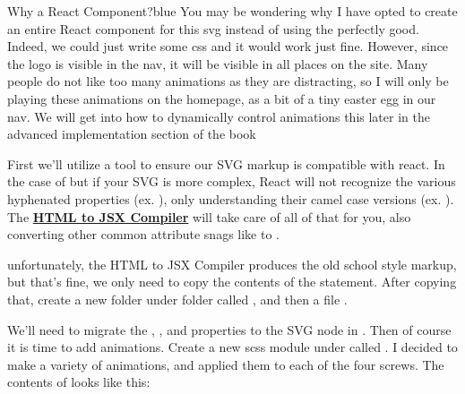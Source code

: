 \documentclass[paper=6in:9in,pagesize=pdftex,headinclude=on,footinclude=on,12pt]{scrbook}
\newcommand{\link}[2]{\textbf{\textcolor{monokaiPink}{\href{#2}{#1}}}}
\begin{document}
\begin{highlightBox}{Why a React Component?}{blue}{\information}
You may be wondering why I have opted to create an entire React component for this svg instead of using the perfectly good. Indeed, we could just write some css and it would work just fine. However, since the logo is visible in the nav, it will be visible in all places on the site. Many people do not like too many animations as they are distracting, so I will only be playing these animations on the homepage, as a bit of a tiny easter egg in our nav. We will get into how to dynamically control animations this later in the advanced implementation section of the book
\end{highlightBox}

First we'll utilize a tool to ensure our SVG markup is compatible with react. In the case of  but if your SVG is more complex, React will not recognize the various hyphenated properties (ex. ), only understanding their camel case versions (ex. ). The \link{HTML to JSX Compiler}{https://magic.reactjs.net/htmltojsx.htm} will take care of all of that for you, also converting other common attribute snags like  to .

unfortunately, the HTML to JSX Compiler produces the old school  style markup, but that's fine, we only need to copy the contents of the  statement. After copying that, create a new folder under  folder called , and then a file . 

We'll need to migrate the , , and  properties to the SVG node in . Then of course it is time to add animations. Create a new scss module under  called . I decided to make a variety of animations, and applied them to each of the four screws. The contents of  looks like this:

\end{document}
